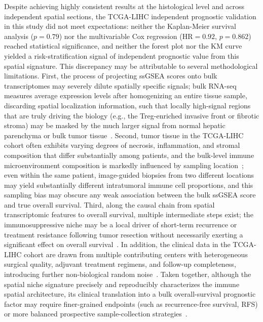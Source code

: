 \documentclass[12pt, a4paper]{article}
\begin{document}
Despite achieving highly consistent results at the histological level and across independent spatial sections, the TCGA-LIHC independent prognostic validation in this study did not meet expectations: neither the Kaplan-Meier survival analysis ($p = 0.79$) nor the multivariable Cox regression ($\text{HR} = 0.92$, $p = 0.862$) reached statistical significance, and neither the forest plot nor the KM curve yielded a risk-stratification signal of independent prognostic value from this spatial signature. This discrepancy may be attributable to several methodological limitations. First, the process of projecting ssGSEA scores onto bulk transcriptomes may severely dilute spatially specific signals; bulk RNA-seq measures average expression levels after homogenizing an entire tissue sample, discarding spatial localization information, such that locally high-signal regions that are truly driving the biology (e.g., the Treg-enriched invasive front or fibrotic stroma) may be masked by the much larger signal from normal hepatic parenchyma or bulk tumor tissue~\citep{svensson2018spatiallyvariable,gao2020loss}. Second, tumor tissue in the TCGA-LIHC cohort often exhibits varying degrees of necrosis, inflammation, and stromal composition that differ substantially among patients, and the bulk-level immune microenvironment composition is markedly influenced by sampling location~\citep{zhang2019landscape}; even within the same patient, image-guided biopsies from two different locations may yield substantially different intratumoral immune cell proportions, and this sampling bias may obscure any weak association between the bulk ssGSEA score and true overall survival. Third, along the causal chain from spatial transcriptomic features to overall survival, multiple intermediate steps exist; the immunosuppressive niche may be a local driver of short-term recurrence or treatment resistance following tumor resection without necessarily exerting a significant effect on overall survival~\citep{zhang2019landscape}. In addition, the clinical data in the TCGA-LIHC cohort are drawn from multiple contributing centers with heterogeneous surgical quality, adjuvant treatment regimens, and follow-up completeness, introducing further non-biological random noise~\citep{liu2018tcga}. Taken together, although the spatial niche signature precisely and reproducibly characterizes the immune spatial architecture, its clinical translation into a bulk overall-survival prognostic factor may require finer-grained endpoints (such as recurrence-free survival, RFS) or more balanced prospective sample-collection strategies~\citep{liu2018tcga}.
\end{document}
